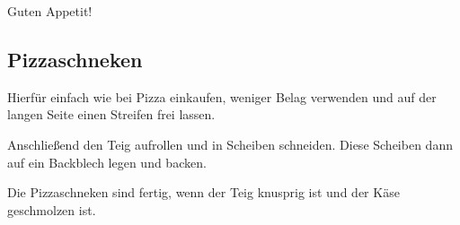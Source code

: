 \documentclass[../../book.tex]{subfiles}
\begin{document}
Guten Appetit!
\subsection{Pizzaschneken}

Hierfür einfach wie bei Pizza einkaufen, weniger Belag verwenden und auf der langen Seite einen Streifen frei lassen.

Anschließend den Teig aufrollen und in Scheiben schneiden. Diese Scheiben dann auf ein Backblech legen und backen.

Die Pizzaschneken sind fertig, wenn der Teig knusprig ist und der Käse geschmolzen ist.

\newpage
\end{document}

